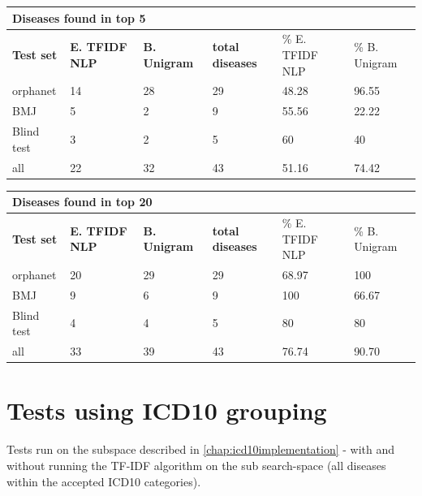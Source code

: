 \documentclass[10pt,letterpaper,two column,final]{article}
\begin{document}
\begin{center}
\begin{small}
\begin{tabular}{l|p{2.2cm}p{2.2cm}||p{1.2cm}p{2.2cm}p{2.2cm}}
	\multicolumn{6}{l}{\textbf{Diseases found in top 5}} \\ \hline
\textbf{Test set} & \textbf{E. TFIDF NLP} &	\textbf{B. Unigram}	 &	\textbf{total diseases} &	\% E. TFIDF NLP	 &\% B. Unigram \\ \hline
orphanet    &   14    &  28    &    29   & 48.28     & 96.55\\
BMJ	        &    5   &    2  &     9  &   55.56   & 22.22\\
Blind test	&    3   &    2  &     5  &   60   & 40 \\ \hline \hline
all	        &    22   &   32   &    43   &  51.16    & 74.42\\ \hline
\end{tabular}
\end{small}
\end{center}

\begin{center}
\begin{small}
\begin{tabular}{l|p{2.2cm}p{2.2cm}||p{1.2cm}p{2.2cm}p{2.2cm}}
	\multicolumn{6}{l}{\textbf{Diseases found in top 20}} \\ \hline
\textbf{Test set} & \textbf{E. TFIDF NLP} &	\textbf{B. Unigram}	 &	\textbf{total diseases} &	\% E. TFIDF NLP	 &\% B. Unigram \\ \hline
orphanet    &    20   & 29     & 29      &   68.97   & 100\\
BMJ	        &    9   &   6   &    9   &  100    & 66.67\\
Blind test	&    4   &   4   &    5   & 80     & 80 \\ \hline \hline
all	        &    33   &  39    &   43    & 76.74     & 90.70 \\ \hline
\end{tabular}
\end{small}
\end{center}


\newpage
\section{Tests using ICD10 grouping}
\label{app:icd10_icd10recalc}
Tests run on the subspace described in \ref{chap:icd10implementation} - with and without running the TF-IDF algorithm on the sub search-space (all diseases within the accepted ICD10 categories).
\end{document}
